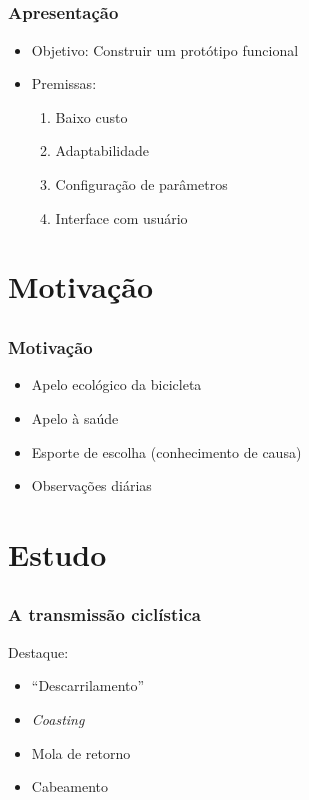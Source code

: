 \documentclass{beamer}
\begin{document}
\subsection{}
\begin{frame}
  \frametitle{Apresentação}
  \begin{itemize}
    \item Objetivo: Construir um protótipo funcional
    \item Premissas:
    \begin{enumerate}
      \item Baixo custo
      \item Adaptabilidade
      \item Configuração de parâmetros
      \item Interface com usuário
    \end{enumerate}

  \end{itemize}

\end{frame}


\section{Motivação}

\subsection{}
\begin{frame}
 \frametitle{Motivação}

  \begin{itemize}[<+->]
    \item Apelo ecológico da bicicleta
    \item Apelo à saúde
    \item Esporte de escolha (conhecimento de causa)
    \item Observações diárias
  \end{itemize}

\end{frame}

\section{Estudo}
\subsection{}
\begin{frame}
  \frametitle{A transmissão ciclística}
  Destaque:
  \begin{itemize}
    \item ``Descarrilamento''
    \item \textit{Coasting}
    \item Mola de retorno
    \item Cabeamento
  \end{itemize}
\end{frame}
\end{document}

